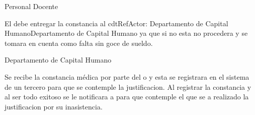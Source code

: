 \begin{PDescripcion}
    \Ppaso Personal Docente
        \begin{enumerate}
            
            \Ppaso[\itarea]  El  debe entregar la constancia al cdtRef{Actor: Departamento de Capital Humano}{Departamento de Capital Humano} ya que si no esta no procedera y se tomara en cuenta como falta sin goce de sueldo.
            \Ppaso[\itarea] 
        \end{enumerate}
    
    \Ppaso Departamento de Capital Humano
        \begin{enumerate}
            \Ppaso[\itarea]  Se recibe la constancia médica por parte del   o  y esta se registrara en el sistema de un tercero para que se contemple la justificacion.
            \Ppaso[\itarea]  Al registrar la constancia y al ser todo exitoso se le notificara a para que contemple el que se a realizado la justificacion por su inasistencia.
        \end{enumerate} 
    
\end{PDescripcion}
